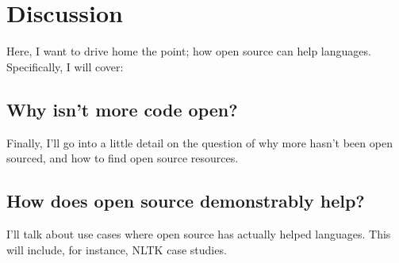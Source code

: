 \section{Discussion}\label{sec:discussion}

Here, I want to drive home the point; how open source can help languages. Specifically, I will cover:

\subsection{Why isn't more code open?}

Finally, I'll go into a little detail on the question of why more hasn't been open sourced, and how to find open source resources.

\subsection{How does open source demonstrably help?}

I'll talk about use cases where open source has actually helped languages. This will include, for instance, NLTK case studies.